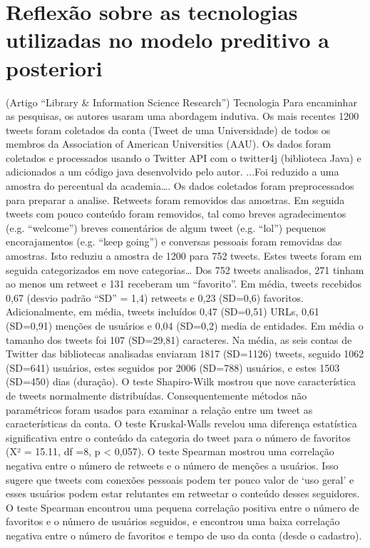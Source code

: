 \section{Reflexão sobre as tecnologias utilizadas no modelo preditivo a posteriori}\label{resultPost}


(Artigo ``Library \& Information Science Research'')
Tecnologia
Para encaminhar as pesquisas, os autores usaram uma abordagem indutiva. Os mais recentes 1200 tweets foram coletados da conta (Tweet de uma Universidade) de todos os membros da Association of American Universities (AAU). Os dados foram coletados e processados usando o Twitter API com o twitter4j (biblioteca Java) e adicionados a um código java desenvolvido pelo autor. ...Foi reduzido a uma amostra do percentual da academia….
Os dados coletados foram preprocessados para preparar a analise. Retweets foram removidos das amostras. Em seguida tweets com pouco conteúdo foram removidos, tal como breves agradecimentos (e.g. “welcome”) breves comentários de algum tweet (e.g. “lol”) pequenos encorajamentos (e.g. “keep going”) e conversas pessoais foram removidas das amostras. Isto reduziu a amostra de 1200 para 752 tweets. Estes tweets foram em seguida categorizados em nove categorias…
Dos 752 tweets analisados, 271 tinham ao menos um retweet e 131 receberam um “favorito”. Em média, tweets recebidos 0,67 (desvio padrão “SD” = 1,4) retweets e 0,23 (SD=0,6) favoritos. Adicionalmente, em média, tweets incluídos 0,47 (SD=0,51) URLs, 0,61 (SD=0,91) menções de usuários e 0,04 (SD=0,2) media de entidades. Em média o tamanho dos tweets foi 107 (SD=29,81) caracteres.
Na média, as seis contas de Twitter das bibliotecas analisadas enviaram 1817 (SD=1126) tweets, seguido 1062 (SD=641) usuários, estes seguidos por 2006 (SD=788) usuários, e estes 1503 (SD=450) dias (duração). O teste Shapiro-Wilk mostrou que nove característica de tweets normalmente distribuídas. Consequentemente métodos não paramétricos foram usados para examinar a relação entre um tweet  as características da conta.
O teste Kruskal-Walls revelou uma diferença estatística significativa entre o conteúdo da categoria do tweet para o número de favoritos (X² = 15.11, df =8, p < 0,057).
O teste Spearman mostrou uma correlação negativa entre o número de retweets e o número de menções a usuários. Isso sugere que tweets com conexões pessoais podem ter pouco valor de ‘uso geral’ e esses usuários podem estar relutantes em retweetar o conteúdo desses seguidores.
O teste Spearman encontrou uma pequena correlação positiva entre o número de favoritos e o número de usuários seguidos, e encontrou uma baixa correlação negativa entre o número de favoritos e tempo de uso da conta (desde o cadastro).

